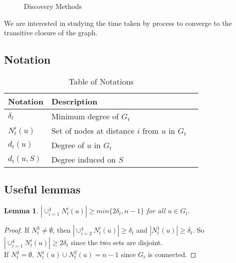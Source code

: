 \documentclass[
10pt, %
a4paper, %
oneside, %
headinclude,footinclude, %
BCOR5mm, %
]{scrartcl}
\newtheorem{lemma}[theorem]{\textbf{Lemma}}
\begin{document}
\begin{figure}[tb]
	\centering
	 \quad
	\caption[Discovery Methods]{Discovery Methods} %
	\label{fig:esempio}
\end{figure}
We are interested in studying the time taken by process to converge to the transitive closure of the graph.
\subsection{Notation}

\begin{table}[hbt]
	\caption{Table of Notations}
	\centering
	\begin{tabular}{llr}
		\cmidrule(r){1-2}
		Notation & Description \\
		\midrule
		$\delta_t$ & Minimum degree of $G_t$  \\
		$N_t^i(u)$ & Set of nodes at distance $i$ from $u$ in $G_t$ \\
		$d_t(u)$ & Degree of $u$ in $G_t$ \\
		$d_t(u, S)$ & Degree induced on $S$ \\
		\bottomrule
	\end{tabular}
	\label{tab:label}
\end{table}

\subsection{Useful lemmas}

\begin{lemma}\label{lem:1}
	$|\cup_{i=1}^{4} N_t^i(u)| \geq min \{ 2\delta_t, n-1\}$ for all $u \in G_t$.
\end{lemma}
\begin{proof}
	If $N_t^3 \ne \emptyset$, then $|\cup_{i=2}^{4} N_t^i(u)| \geq \delta_t$ and $|N_t^1(u)| \geq \delta_t$. So $|\cup_{i=1}^{4} N_t^i(u)| \geq 2\delta_t$ since the two sets are disjoint. \\
	If $N_t^3 = \emptyset$, $N_t^1(u) \cup N_t^2(u) = n-1$ since $G_t$ is connected.
\end{proof}
\end{document}
